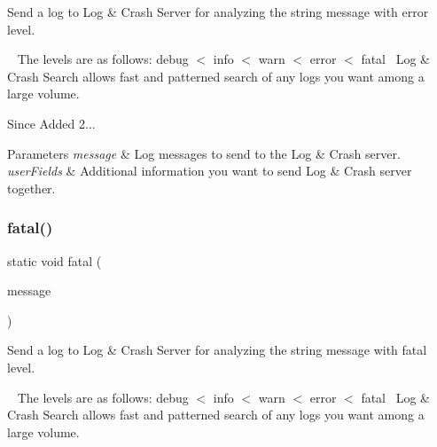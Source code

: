 Send a log to Log \& Crash Server for analyzing the string message with error level. 

~\newline
 The levels are as follows\+: debug $<$ info $<$ warn $<$ error $<$ fatal~\newline
 Log \& Crash Search allows fast and patterned search of any logs you want among a large volume.

\begin{DoxySince}{Since}
Added 2... 
\end{DoxySince}

\begin{DoxyParams}{Parameters}
{\em message} & Log messages to send to the Log \& Crash server. \\
\hline
{\em user\+Fields} & Additional information you want to send Log \& Crash server together. \\
\hline
\end{DoxyParams}
\mbox{\label{classcom_1_1toast_1_1android_1_1gamebase_1_1_gamebase_1_1_logger_a372dc6703eff9082addb56057401a166}} 
\subsubsection{\texorpdfstring{fatal()}{fatal()}\hspace{0.1cm}{\footnotesize\ttfamily [1/3]}}
{\footnotesize\ttfamily static void fatal (\begin{DoxyParamCaption}\item[{@Non\+Null final String}]{message }\end{DoxyParamCaption})\hspace{0.3cm}{\ttfamily [static]}}



Send a log to Log \& Crash Server for analyzing the string message with fatal level. 

~\newline
 The levels are as follows\+: debug $<$ info $<$ warn $<$ error $<$ fatal~\newline
 Log \& Crash Search allows fast and patterned search of any logs you want among a large volume.

